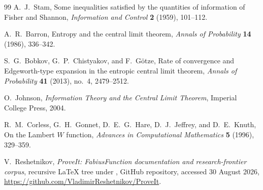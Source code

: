 \documentclass[11pt,oneside]{article}
\theoremstyle{definition}
\theoremstyle{remark}
\begin{document}
\begin{thebibliography}{99}
A.~J.~Stam,
\newblock Some inequalities satisfied by the quantities of information of Fisher
and Shannon,
\newblock \emph{Information and Control} \textbf{2} (1959), 101--112.

A.~R.~Barron,
\newblock Entropy and the central limit theorem,
\newblock \emph{Annals of Probability} \textbf{14} (1986), 336--342.

S.~G.~Bobkov, G.~P.~Chistyakov, and F.~G\"otze,
\newblock Rate of convergence and Edgeworth-type expansion in the entropic
central limit theorem,
\newblock \emph{Annals of Probability} \textbf{41} (2013), no.~4, 2479--2512.

O.~Johnson,
\newblock \emph{Information Theory and the Central Limit Theorem},
\newblock Imperial College Press, 2004.

R.~M.~Corless, G.~H.~Gonnet, D.~E.~G.~Hare, D.~J.~Jeffrey, and D.~E.~Knuth,
\newblock On the Lambert $W$ function,
\newblock \emph{Advances in Computational Mathematics} \textbf{5} (1996),
329--359.

V.~Reshetnikov,
\newblock \emph{ProveIt: FabiusFunction documentation and research-frontier
corpus},
\newblock recursive LaTeX tree under
, GitHub repository, accessed 30 August 2026,
\url{https://github.com/VladimirReshetnikov/ProveIt}.

\end{thebibliography}
\end{document}
